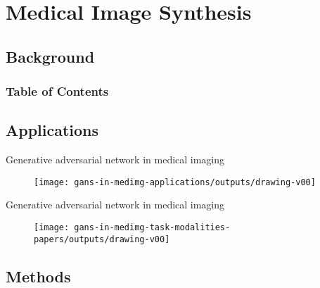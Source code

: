 
\section{Medical Image Synthesis}
\subsection{Background}
\begin{frame}
  \frametitle{Table of Contents}
  \tableofcontents[currentsection]
\end{frame}





\subsection{Applications}


{

\begin{frame}{Generative adversarial network in medical imaging}{}
      \begin{figure}
        \centering
        \texttt{[image: gans-in-medimg-applications/outputs/drawing-v00]}
      \end{figure}
\end{frame}
}

{

\begin{frame}{Generative adversarial network in medical imaging}{}
      \begin{figure}
        \centering
        \texttt{[image: gans-in-medimg-task-modalities-papers/outputs/drawing-v00]}
      \end{figure}
\end{frame}
}




\subsection{Methods}

